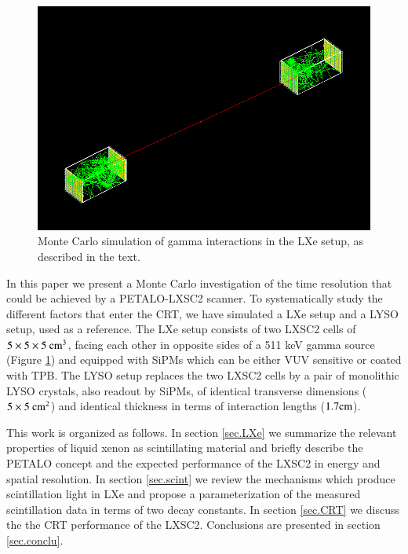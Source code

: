 \documentclass[review]{elsarticle}
\begin{document}
 \begin{figure}[!bthp]
	\centering
	\includegraphics[scale=0.4]{../img/PetaloSetup.png}
	\caption{\label{fig.psetup} Monte Carlo simulation of gamma interactions in the LXe setup, as 
	described in the text.}
\end{figure}

In this paper we present a Monte Carlo investigation of the time resolution
that could be achieved by a PETALO-LXSC2 scanner. To systematically study the different factors that enter the CRT, we have simulated a LXe setup and a LYSO setup, used as a reference. The LXe setup consists of two LXSC2 cells of 
$5 \times 5 \times 5 {\rm ~cm^3}$, facing each other in opposite sides of a 511 keV gamma source 
(Figure \ref{fig.psetup}) and equipped with SiPMs which can be either VUV sensitive or coated with  TPB. The  LYSO setup replaces the two LXSC2 cells by a pair of  monolithic LYSO crystals, also readout by SiPMs, of identical transverse dimensions ($5 \times 5 {\rm ~cm^2}$) and identical thickness in terms of interaction lengths ($1.7 {\rm cm}$).  

This work is organized as follows. In section \ref{sec.LXe} we summarize the relevant properties of liquid xenon as scintillating material and briefly describe the PETALO concept and the expected performance of the LXSC2 in energy and spatial resolution. In section \ref{sec.scint} we review the mechanisms which produce scintillation light in LXe and propose a parameterization of the measured scintillation data in terms of two decay constants. In section \ref{sec.CRT} we discuss the the CRT performance of the LXSC2. Conclusions are presented in section \ref{sec.conclu}. 
\end{document}
